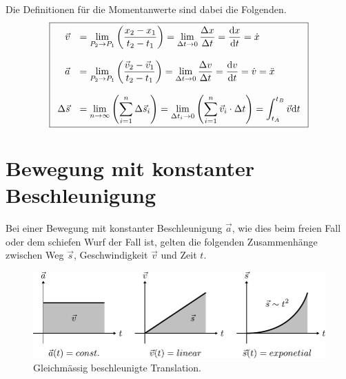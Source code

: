 \noindent
Die Definitionen für die Momentanwerte sind dabei die Folgenden.
\[\boxed{\begin{array}{r l}
	\vec{v}	&
		= \displaystyle \lim\limits_{P_2 \rightarrow P_1} 
			{\left( \frac{x_2 - x_1}{t_2 - t_1} \right)}
		= \displaystyle \lim\limits_{\Delta t \rightarrow 0}
			{\frac{\Delta x}{\Delta t}}
		= \displaystyle \frac{\mathrm{d}x}{\mathrm{d}t}=\dot{x} \\
	& \\
	\vec{a} &
		= \displaystyle \lim\limits_{P_2 \rightarrow P_1}
			{\left( \frac{\vec{v}_2 
			- \vec{v}_1}{t_2 - t_1} \right)}
		= \displaystyle \lim\limits_{\Delta t \rightarrow 0}
			{\frac{\Delta v}{\Delta t}}
		= \displaystyle \frac{\mathrm{d}v}{\mathrm{d}t}
		= \displaystyle \dot{v}
		= \ddot{x} \\
	& \\
	\Delta \vec{s} &
		= \displaystyle \lim\limits_{n \rightarrow \infty}
			{\left( \sum_{i=1}^{n} \Delta \vec{s}_i \right)}
		= \displaystyle \lim\limits_{\Delta t_i \rightarrow 0}
			{\left(
				\sum^{n}_{i=1}\vec{v}_i\cdot\Delta t
			\right)}
		= \displaystyle \int_{t_A}^{t_B}\vec{v}\mathrm{d}t
\end{array}}\]

\section{Bewegung mit konstanter Beschleunigung}
Bei einer Bewegung mit konstanter Beschleunigung $\vec{a}$, wie dies beim
freien Fall oder dem schiefen Wurf der Fall ist, gelten die folgenden
Zusammenhänge zwischen Weg $\vec{s}$, Geschwindigkeit $\vec{v}$ und 
Zeit $t$.

\begin{figure}[h!]
	\centering
	\includegraphics[scale=0.7]{bewegung.pdf}
	\caption{Gleichmässig beschleunigte Translation.}
	\label{fig:bewegung}
\end{figure}

